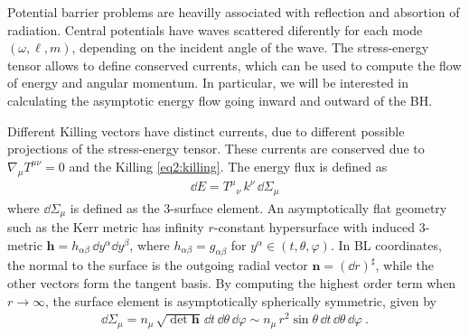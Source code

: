 Potential barrier problems are heavilly associated with reflection and absortion of radiation. 
Central potentials have waves scattered diferently for each mode $(\omega, \ell, m)$, depending on the incident angle of the wave.
The stress-energy tensor allows to define conserved currents, which can be used to compute the flow of energy and angular momentum.
In particular, we will be interested in calculating the asymptotic energy flow going inward and outward of the BH.

Different Killing vectors have distinct currents, due to different possible projections of the stress-energy tensor.
These currents are conserved due to $\nabla_\mu T^{\mu\nu}=0$ and the Killing \eqref{eq2:killing}.
The energy flux is defined as
\begin{align}
    \label{eq3:fluxE}
    \dd E = T^{\mu}{}_\nu \, k^\nu \,\dd\Sigma_\mu
\end{align}
where $\dd \Sigma_\mu$ is defined as the 3-surface element.
An asymptotically flat geometry such as the Kerr metric has infinity $r$-constant hypersurface with induced 3-metric $\bm{h} = h_{\alpha\beta} \,\dd y^\alpha \dd y^\beta$, where $h_{\alpha\beta} = g_{\alpha\beta}$ for $y^\alpha \in (t, \theta, \varphi)$.
In BL coordinates, the normal to the surface is the outgoing radial vector $\bm{n}=(\dd r)^\sharp$, while the other vectors form the tangent basis.
By computing the highest order term when $r\to\infty$, the surface element is asymptotically spherically symmetric, given by
\begin{align}
    \label{eq3:radial3SurfaceElement}
    \dd\Sigma_\mu = n_\mu \,\sqrt{\det{\bm{h}}} \,\dd t \,\dd \theta \,\dd \varphi \sim n_\mu \,r^2 \sin\theta \,\dd t \,\dd \theta \,\dd \varphi ~.
\end{align}

